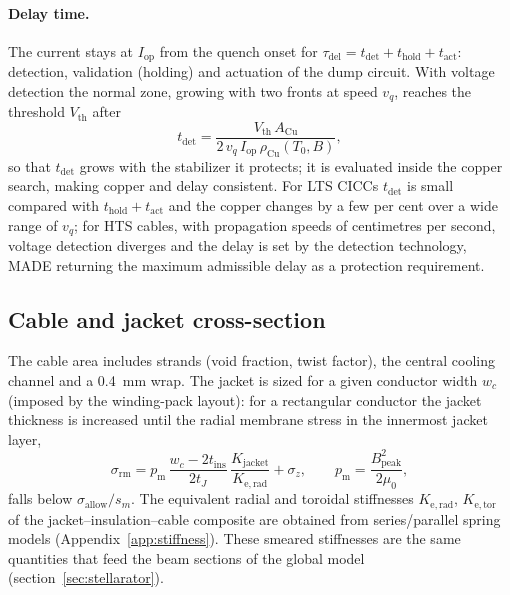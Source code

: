 \paragraph{Delay time.} The current stays at $I_\mathrm{op}$ from the
quench onset for $\tau_\mathrm{del}=t_\mathrm{det}+t_\mathrm{hold}+t_\mathrm{act}$:
detection, validation (holding) and actuation of the dump circuit. With
voltage detection the normal zone, growing with two fronts at speed $v_q$,
reaches the threshold $V_\mathrm{th}$ after
\begin{equation}
t_\mathrm{det}=\frac{V_\mathrm{th}\,A_\mathrm{Cu}}{2\,v_q\,I_\mathrm{op}\,\rho_\mathrm{Cu}(T_0,B)},
\end{equation}
so that $t_\mathrm{det}$ grows with the stabilizer it protects; it is
evaluated inside the copper search, making copper and delay consistent.
For LTS CICCs $t_\mathrm{det}$ is small compared with
$t_\mathrm{hold}+t_\mathrm{act}$ and the copper changes by a few per cent
over a wide range of $v_q$; for HTS cables, with propagation speeds of
centimetres per second, voltage detection diverges and the delay is set
by the detection technology, MADE returning the maximum admissible delay
as a protection requirement. 

\subsection{Cable and jacket cross-section}
The cable area includes strands (void fraction, twist factor), the central
cooling channel and a 0.4~mm wrap. The jacket is sized for a given
conductor width $w_c$ (imposed by the winding-pack layout): for a
rectangular conductor the jacket thickness is increased until the radial
membrane stress in the innermost jacket layer,
\begin{equation}
  \sigma_\mathrm{rm} = p_\mathrm{m}\,\frac{w_c-2t_\mathrm{ins}}{2t_J}\,
  \frac{K_\mathrm{jacket}}{K_\mathrm{e,rad}} + \sigma_{z},\qquad
  p_\mathrm{m}=\frac{B_\mathrm{peak}^2}{2\mu_0},
\end{equation}
falls below $\sigma_\mathrm{allow}/s_m$. The equivalent radial and
toroidal stiffnesses $K_\mathrm{e,rad}$, $K_\mathrm{e,tor}$ of the
jacket--insulation--cable composite are obtained from series/parallel
spring models (Appendix~\ref{app:stiffness}). These smeared stiffnesses
are the same quantities that feed the beam sections of the global model
(section~\ref{sec:stellarator}).
